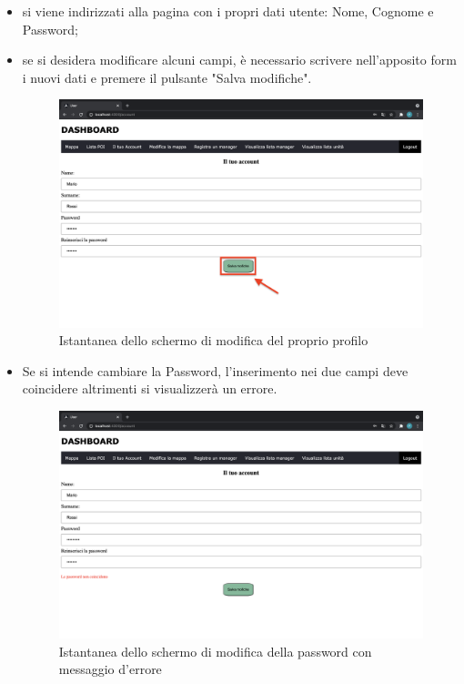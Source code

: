\begin{itemize}
    \item si viene indirizzati alla pagina con i propri dati utente: Nome, Cognome e Password;
    \item se si desidera modificare alcuni campi, è necessario scrivere nell'apposito form i nuovi dati e premere il pulsante "Salva modifiche".
    \begin{figure}[H]
        \centering
        \includegraphics[scale=0.12]{res/images/account_user.png}
        \caption{Istantanea dello schermo di modifica del proprio profilo}
    \end{figure}
    \item Se si intende cambiare la Password, l'inserimento nei due campi deve coincidere altrimenti si visualizzerà un errore.
    \begin{figure}[H]
        \centering
        \includegraphics[scale=0.12]{res/images/account_errore.png}
        \caption{Istantanea dello schermo di modifica della password con messaggio d'errore}
    \end{figure}
\end{itemize}


